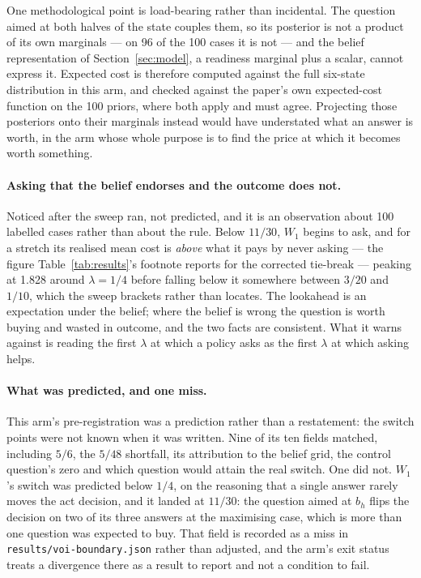 \documentclass{article}
\begin{document}
One methodological point is load-bearing rather than incidental. The question aimed at
both halves of the state couples them, so its posterior is not a
product of its own marginals --- on 96 of the 100 cases it is not --- and the
belief representation of Section~\ref{sec:model}, a readiness marginal plus a scalar,
cannot express it. Expected cost is therefore computed against the full six-state
distribution in this arm, and checked against the paper's own expected-cost function
on the 100 priors, where both apply and must agree. Projecting those posteriors onto
their marginals instead would have understated what an answer is worth, in the arm
whose whole purpose is to find the price at which it becomes worth something.

\paragraph{Asking that the belief endorses and the outcome does not.} Noticed after
the sweep ran, not predicted, and it is an observation about 100 labelled cases rather
than about the rule. Below $11/30$, $W_1$ begins to ask, and for a stretch its
realised mean cost is \emph{above} what it pays by never asking --- the figure
Table~\ref{tab:results}'s footnote reports for the corrected tie-break --- peaking at
1.828 around $\lambda = 1/4$ before falling below it somewhere between $3/20$ and
$1/10$, which the sweep brackets rather than locates. The lookahead is an expectation
under the belief;
where the belief is wrong the question is worth buying and wasted in outcome, and the
two facts are consistent. What it warns against is reading the first $\lambda$ at
which a policy asks as the first $\lambda$ at which asking helps.

\paragraph{What was predicted, and one miss.} This arm's pre-registration was a
prediction rather than a restatement: the switch points were not known when it was
written. Nine of its ten fields matched, including $5/6$, the $5/48$ shortfall, its
attribution to the belief grid, the control question's zero and which question would
attain the real switch. One did not. $W_1$'s switch was predicted below $1/4$, on the
reasoning that a single answer rarely moves the act decision, and it landed at
$11/30$: the question aimed at $b_h$ flips the decision on two of its three answers at
the maximising case, which is more than one question was expected to buy. That field
is recorded as a miss in \texttt{results/voi-boundary.json} rather than adjusted, and
the arm's exit status treats a divergence there as a result to report and not a
condition to fail.
\end{document}
